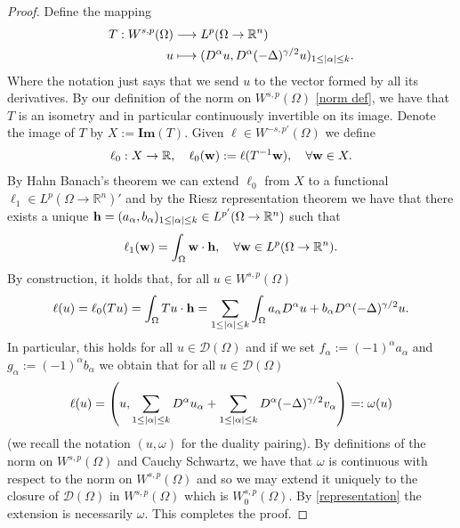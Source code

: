 \documentclass[
    a4paper,
    DIV=14,
    abstract=true,
    numbers=noenddot
]
{scrartcl}
\theoremstyle{definition}
\renewcommand{\Im}{\bm{Im}}
\newcommand{\R}{\mathbb{R}}
\newcommand{\Dd}{\mathcal{D}}
\begin{document}
\begin{proof}
	Define the mapping
	\begin{align*}
		T: W^{s,p}(\Omega ) & \longrightarrow L^p(\Omega \to \R^n)                                                   \\
		u                   & \longmapsto(D^\alpha u, D^\alpha (-\Delta )^{\gamma /2} u)_{1 \leq\abs{\alpha}\leq k}.
	\end{align*}
	Where the notation just says that we send $u$ to the vector formed by all its derivatives. By our definition of the norm on $W^{s,p}(\Omega )$ \eqref{norm def}, we have that $T$ is an isometry and in particular continuously invertible on its image. Denote the image of $T$ by $X:=\Im(T)$. Given $\ell \in W^{-s,p'}(\Omega )$ we define
	\begin{align*}
		\ell_0: X \to \R, \quad \ell_0(\vb{w}):= \ell(T^{-1}\vb{w}), \quad \forall \vb{w} \in X.
	\end{align*}
	By Hahn Banach's theorem we can extend $\ell_0$ from $X$ to a functional $\ell_1 \in  L^p(\Omega \to \R^n)'$ and by the Riesz representation theorem we have that there exists a unique $\vb{h}=(a_\alpha, b_\alpha)_{1\leq \abs{\alpha}\leq k }\in L^{p'}(\Omega \to \R^n)$ such that
	\begin{align*}
		\ell_1(\vb{w})=\int_{\Omega}\vb{w}\cdot \vb{h}, \quad \forall \vb{w} \in L^p(\Omega \to \R^n).
	\end{align*}
	By construction, it holds that, for all $u \in W^{s,p}(\Omega )$
	\begin{align*}
		\ell(u)=\ell_0(Tu)=\int_{\Omega}Tu\cdot \vb{h}=\sum_{1\leq\left| \alpha \right|\leq k}\int_{\Omega}a_\alpha D^\alpha u  +b_\alpha D^\alpha (-\Delta )^{\gamma /2}u.
	\end{align*}
	In particular, this holds for all $u \in \Dd(\Omega )$ and if we set $f_\alpha:=(-1)^\alpha a_\alpha$ and $g_\alpha:=(-1)^\alpha b_\alpha$ we obtain that for all $u \in \Dd(\Omega )$
	\begin{align}\label{representation}
		\ell(u)=\left(u,\sum_{1\leq\left| \alpha \right|\leq k} D^\alpha u_\alpha+ \sum_{1\leq\left| \alpha \right|\leq k} D^\alpha (-\Delta )^{\gamma /2}v_\alpha\right)=: \omega(u)
	\end{align}
	(we recall the notation $(u,\omega)$ for the duality pairing). By definitions of the norm on $W^{s,p}(\Omega )$ and Cauchy Schwartz, we have that $\omega$ is continuous with respect to the norm on $W^{s,p}(\Omega )$ and so we may extend it uniquely to the closure of $\Dd(\Omega )$ in $W^{s,p}(\Omega )$ which is $W^{s,p}_0(\Omega )$. By \eqref{representation} the extension is necessarily $\omega$. This completes the proof.
\end{proof}
\end{document}
